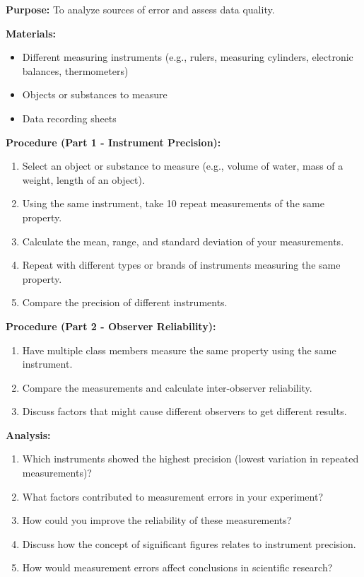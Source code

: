\documentclass[justified,notoc]{tufte-book}
\newenvironment{investigation}[1]{%
    \begin{tcolorbox}[colback=info!10,colframe=info,title=\textbf{Investigation: #1}]
}{%
    \end{tcolorbox}
}
\begin{document}
\begin{investigation}{Evaluating Data Reliability and Validity}
\textbf{Purpose:} To analyze sources of error and assess data quality.

\textbf{Materials:}
\begin{itemize}
    \item Different measuring instruments (e.g., rulers, measuring cylinders, electronic balances, thermometers)
    \item Objects or substances to measure
    \item Data recording sheets
\end{itemize}

\textbf{Procedure (Part 1 - Instrument Precision):}
\begin{enumerate}
    \item Select an object or substance to measure (e.g., volume of water, mass of a weight, length of an object).
    \item Using the same instrument, take 10 repeat measurements of the same property.
    \item Calculate the mean, range, and standard deviation of your measurements.
    \item Repeat with different types or brands of instruments measuring the same property.
    \item Compare the precision of different instruments.
\end{enumerate}

\textbf{Procedure (Part 2 - Observer Reliability):}
\begin{enumerate}
    \item Have multiple class members measure the same property using the same instrument.
    \item Compare the measurements and calculate inter-observer reliability.
    \item Discuss factors that might cause different observers to get different results.
\end{enumerate}

\textbf{Analysis:}
\begin{enumerate}
    \item Which instruments showed the highest precision (lowest variation in repeated measurements)?
    \item What factors contributed to measurement errors in your experiment?
    \item How could you improve the reliability of these measurements?
    \item Discuss how the concept of significant figures relates to instrument precision.
    \item How would measurement errors affect conclusions in scientific research?
\end{enumerate}
\end{investigation}
\end{document}

